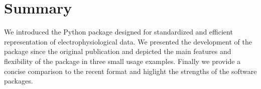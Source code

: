 \section{Summary}
We introduced the  Python package designed for standardized and efficient representation of electrophysiological data. We presented the development of the package since the original publication and depicted the main features and flexibility of the package in three small usage examples. Finally we provide a concise comparison to the recent  format and higlight the strengths of the software packages. 

